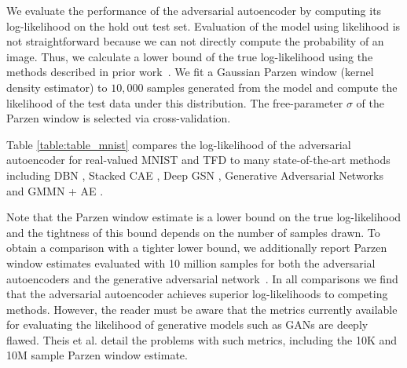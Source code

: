 \documentclass{article}
\begin{document}
We evaluate the performance of the adversarial autoencoder by computing its log-likelihood on the hold out test set. Evaluation of the model using likelihood is not straightforward because we can not directly compute the probability of an image.
Thus, we calculate a lower bound of the true log-likelihood using the methods described in prior work~\citep{stacked_cae,gsn,gan}.
We fit a Gaussian Parzen window (kernel density estimator) to $10,000$ samples generated from the model and compute the likelihood of the test data under this distribution.
The free-parameter $\sigma$ of the Parzen window is selected via cross-validation.

Table \ref{table:table_mnist} compares the log-likelihood of the adversarial autoencoder for real-valued MNIST and TFD to many state-of-the-art methods including DBN \citep{geoff}, Stacked CAE \citep{stacked_cae}, Deep GSN \citep{gsn}, Generative Adversarial Networks \citep{gan} and GMMN + AE \citep{gmmn}.

Note that the Parzen window estimate is a lower bound on the true log-likelihood and the tightness of this bound depends on the number of samples drawn.
To obtain a comparison with a tighter lower bound, we additionally report Parzen window estimates evaluated with 10 million samples for both the adversarial autoencoders and the generative adversarial network~\citep{gan}.
In all comparisons we find that the adversarial autoencoder achieves superior log-likelihoods to competing methods.
However, the reader must be aware that the metrics currently available for evaluating the likelihood of generative models such as GANs are deeply flawed. 
Theis et al. \citep{theis} detail the problems with such metrics, including the 10K and 10M sample Parzen window estimate.
\end{document}
